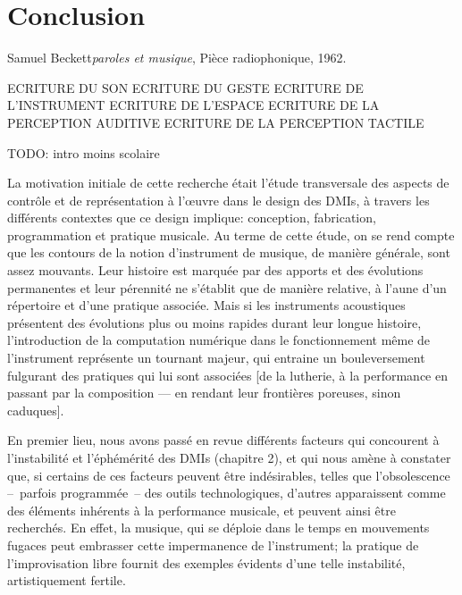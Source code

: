 %
\chapter{Conclusion}
\label{ch:conclusion}

{Samuel Beckett}{\textit{paroles et musique}, Pièce radiophonique, 1962. \cite{beckett_comeet_2014}}

ECRITURE DU SON
ECRITURE DU GESTE
ECRITURE DE L'INSTRUMENT
ECRITURE DE L'ESPACE
ECRITURE DE LA PERCEPTION AUDITIVE
ECRITURE DE LA PERCEPTION TACTILE

TODO: intro moins scolaire

\noindent La motivation initiale de cette recherche était l'étude transversale des aspects de contrôle et de représentation à l'œuvre dans le design des \glspl{DMI}, à travers les différents contextes que ce design implique: conception, fabrication, programmation et pratique musicale. Au terme de cette étude, on se rend compte que les contours de la notion d'instrument de musique, de manière générale, sont assez mouvants. Leur histoire est marquée par des apports et des évolutions permanentes et leur pérennité ne s'établit que de manière relative, à l'aune d'un répertoire et d'une pratique associée. Mais si les instruments acoustiques présentent des évolutions plus ou moins rapides durant leur longue histoire, l'introduction de la computation numérique dans le fonctionnement même de l'instrument représente un tournant majeur, qui entraine un bouleversement fulgurant des pratiques qui lui sont associées [de la lutherie, à la performance en passant par la composition — en rendant leur frontières poreuses, sinon caduques].

\noindent En premier lieu, nous avons passé en revue différents facteurs qui concourent à l'instabilité et l'éphémérité des \glspl{DMI} (chapitre 2), et qui nous amène à constater que, si certains de ces facteurs peuvent être indésirables, telles que l'obsolescence --~parfois programmée~-- des outils technologiques, d'autres apparaissent comme des éléments inhérents à la performance musicale, et peuvent ainsi être recherchés. En effet, la musique, qui se déploie dans le temps en mouvements fugaces peut embrasser cette impermanence de l'instrument; la pratique de l'improvisation libre fournit des exemples évidents d'une telle instabilité, artistiquement fertile.


